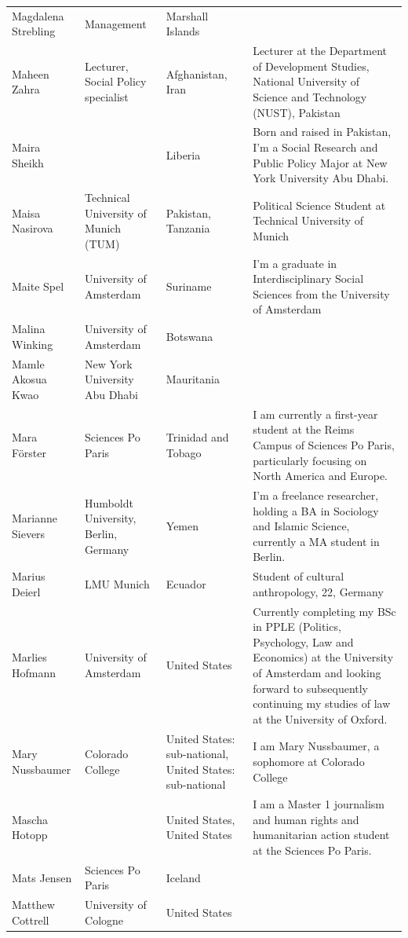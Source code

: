 \documentclass[]{article}
\begin{document}
\begin{longtable}{l>{\raggedright\arraybackslash}p{2cm}>{\raggedright\arraybackslash}p{2cm}>{\raggedright\arraybackslash}p{3cm}}
Magdalena Strebling & Management & Marshall Islands & \\
\rowcolor{gray!6}  Maheen Zahra & Lecturer, Social Policy specialist & Afghanistan, Iran & Lecturer at the Department of Development Studies, National University of Science and Technology (NUST), Pakistan\\
Maira Sheikh &  & Liberia & Born and raised in Pakistan, I'm a Social Research and Public Policy Major at New York University Abu Dhabi.\\
\rowcolor{gray!6}  Maisa Nasirova & Technical University of Munich (TUM) & Pakistan, Tanzania & Political Science Student at Technical University of Munich\\
\addlinespace
Maite Spel & University of Amsterdam & Suriname & I'm a graduate in Interdisciplinary Social Sciences from the University of Amsterdam\\
\rowcolor{gray!6}  Malina Winking & University of Amsterdam & Botswana & \\
Mamle Akosua Kwao & New York University Abu Dhabi & Mauritania & \\
\rowcolor{gray!6}  Mara Förster & Sciences Po Paris & Trinidad and Tobago & I am currently a first-year student at the Reims Campus of Sciences Po Paris, particularly focusing on North America and Europe.\\
Marianne Sievers & Humboldt University, Berlin, Germany & Yemen & I'm a freelance researcher, holding a BA in Sociology and Islamic Science, currently a MA student in Berlin.\\
\addlinespace
\rowcolor{gray!6}  Marius Deierl & LMU Munich & Ecuador & Student of cultural anthropology, 22, Germany\\
Marlies Hofmann & University of Amsterdam & United States & Currently completing my BSc in PPLE (Politics, Psychology, Law and Economics) at the University of Amsterdam and looking forward to subsequently continuing my studies of law at the University of Oxford.\\
\rowcolor{gray!6}  Mary Nussbaumer & Colorado College & United States: sub-national, United States: sub-national & I am Mary Nussbaumer, a sophomore at Colorado College\\
Mascha Hotopp &  & United States, United States & I am a Master 1 journalism and human rights and humanitarian action student at the Sciences Po Paris.\\
\rowcolor{gray!6}  Mats Jensen & Sciences Po Paris & Iceland & \\
\addlinespace
Matthew Cottrell & University of Cologne & United States & \\

\end{longtable}
\end{document}
